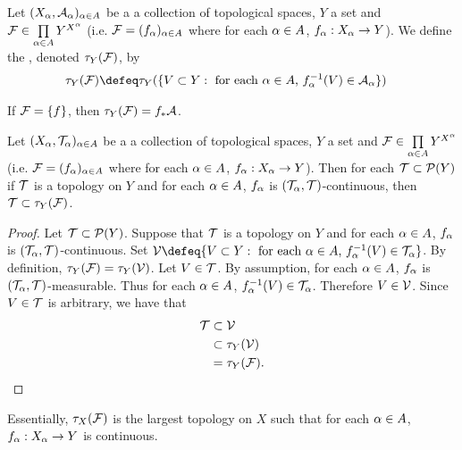 \documentclass{book}
\begin{document}
	\begin{defn} 
	Let $(X_{\alpha}, \mathcal{A}_{\alpha})_{\alpha \in A}$ be a a collection of topological spaces, $Y$ a set and $\mathcal{F} \in \prod \limits_{\alpha \in A}Y^{X^{\alpha}}$ (i.e. $\mathcal{F} = (f_{\alpha})_{\alpha \in A}$ where for each $\alpha \in A$, $f_{\alpha}:X_{\alpha} \rightarrow Y$). We define the , denoted $\tau_Y(\mathcal{F})$, by 
	\begin{align*}
	\tau_Y(\MF) 
	& \defeq \tau_Y(\{V \subset Y: \text{ for each $\al \in A$, $f_{\al}^{-1}(V) \in \MA_{\al}$}\})
\end{align*}	 
	\end{defn}
	
	\begin{note}
	If $\mathcal{F} = \{f\}$, then $\tau_Y(\mathcal{F}) = f_*\mathcal{A}$.
	\end{note}

	\begin{ex} 
		Let $(X_{\alpha}, \mathcal{T}_{\alpha})_{\alpha \in A}$ be a a collection of topological spaces, $Y$ a set and $\mathcal{F} \in \prod \limits_{\alpha \in A}Y^{X^{\alpha}}$ (i.e. $\mathcal{F} = (f_{\alpha})_{\alpha \in A}$ where for each $\alpha \in A$, $f_{\alpha}:X_{\alpha} \rightarrow Y$). Then for each $\mathcal{T} \subset \mathcal{P}(Y)$ if $\mathcal{T}$ is a topology on $Y$ and for each $\alpha \in A$, $f_{\alpha}$ is $(\mathcal{T}_{\alpha}, \mathcal{T})$-continuous, then $\mathcal{T} \subset \tau_Y(\mathcal{F})$.
	\end{ex}

	\begin{proof}
		Let $\mathcal{T} \subset \mathcal{P}(Y)$. Suppose that $\mathcal{T}$ is a topology on $Y$ and for each $\alpha \in A$, $f_{\alpha}$ is $(\mathcal{T}_{\alpha}, \mathcal{T})$-continuous. Set $\MV \defeq \{V \subset Y: \text{ for each $\al \in A$, $f_{\al}^{-1}(V) \in \MT_{\al}$}\}$. By definition, $\tau_Y(\mathcal{F}) = \tau_Y(\mathcal{V})$. Let $V \in \mathcal{T}$. By assumption, for each $\alpha \in A$, $f_{\alpha}$ is $(\mathcal{T}_{\alpha}, \mathcal{T})$-measurable. Thus for each $\alpha \in A$, $f_{\alpha}^{-1}(V) \in \mathcal{T}_{\alpha}$. Therefore $V \in \mathcal{V}$. Since $V \in \mathcal{T}$ is arbitrary, we have that 
		\begin{align*}
			\mathcal{T} 
			& \subset \mathcal{V} \\
			& \subset \tau_Y(\mathcal{V}) \\
			& = \tau_Y(\mathcal{F}).
		\end{align*}
	\end{proof}
	
	\begin{note}
	Essentially, $\tau_X(\mathcal{F})$ is the largest topology on $X$ such that for each $\alpha \in A$, $f_{\alpha}:X_{\alpha} \rightarrow Y$ is continuous. 
	\end{note}
	
\end{document}

